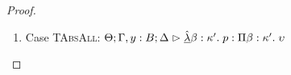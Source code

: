 \begin{proof}
\begin{enumerate}
  First, the syntax:
  \begin{tabbedproof}
    \oo By inversion, $\judgeA[\Theta, \beta:\kappa'; \Gamma, y:B; \Delta]{p}{\upsilon}$ \\
    \oo By weakening, $\judgeE[\Theta, \beta:\kappa']{\Gamma}{e''}{B}$ \\
    \oo By induction, $\judgeA[\Theta, \beta:\kappa'; \Gamma; \Delta]{{[e''/y]}p}{\upsilon}$ \\
    \oo By rule, $\judgeA[\Theta; \Gamma; \Delta]{\pfun{\beta}{\kappa'}{{[e''/y]}p}}{\kappa' \To \upsilon}$ \\
    \oo By def of subst, $\judgeA{{[e''/y]}(\pfun{\beta}{\kappa'}{p})}{\kappa' \To \upsilon}$ \\
  \end{tabbedproof}
  For semantics, consider $\interp{\judgeA{[e''/y](\pfun{\beta}{\kappa'}{p})}{\kappa' \To \upsilon}}\;\theta\;\gamma\;\delta$ \\
  \begin{eqnproof}
          {Semantics}
          {Induction}
          {Strengthening}
          {Semantics}
  \end{eqnproof}
  This case relies upon the fact that $\Gamma$ and $\Delta$ do not have $\beta$ free and the 
  equality of sorts under substitution. 

\item Case \textsc{TAbsAll}: $\judgeA[\Theta; \Gamma, y:B; \Delta]{\pfunall{\beta}{\kappa'}{p}}{\forallsort{\beta}{\kappa'}{\upsilon}}$
  

\end{enumerate}
\end{proof}
